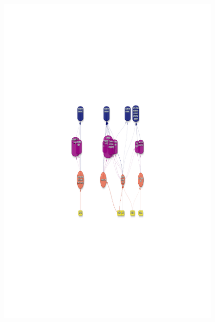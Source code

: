 \documentclass[
sn-nature
]{sn-jnl}
\begin{document}
\begin{figure}
\begin{minipage}{\linewidth}
{\includegraphics{index_files/figure-pdf/fig-therapy-examples-3.pdf}

}


\end{minipage}%
\newline
\begin{minipage}{\linewidth}

\centering{

}
\end{minipage}
\end{figure}
\end{document}

